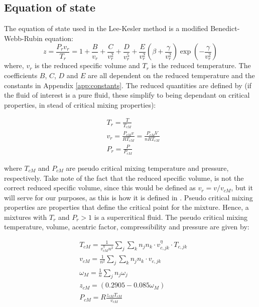 \documentclass[english]{../thermomemo/thermomemo}
\numberwithin{equation}{section}
\begin{document}
\subsection{Equation of state}
The equation of state used in the Lee-Kesler method is a modified Benedict-Webb-Rubin equation:
\begin{equation}
\label{def:z_LK}
z = \frac{P_r v_r}{T_r} = 1 + \frac{B}{v_r} + \frac{C}{v_r^2} + \frac{D}{v_r^5} + \frac{E}{v_r^2} \left( \beta + \frac{\gamma}{v_r^2} \right) \exp{\left(-\frac{\gamma}{v_r^2}\right)}
\end{equation}
where, $v_r$ is the reduced specific volume and $T_r$ is the reduced temperature. The coefficients $B$, $C$, $D$ and $E$ are all dependent on the reduced temperature and the constants in Appendix \ref{app:constants}. The reduced quantities are defined by (if the fluid of interest is a pure fluid, these simplify to being dependant on critical properties, in stead of critical mixing properties):

\begin{align}
& T_r = \frac{T}{T_{cM}} \label{eq:T_r} \\
& v_r = \frac{P_{cM} v}{R T_{cM}} = \frac{P_{cM} V}{n R T_{cM}} \label{eq:v_r} \\
& P_r = \frac{P}{P_{cM}} \label{eq:P_r} 
\end{align}

where $T_{cM}$ and $P_{cM}$ are pseudo critical mixing temperature and pressure, respectively. Take note of the fact that the reduced specific volume, is not the correct reduced specific volume, since this would be defined as $v_r = v/v_{cM}$, but it will serve for our purposes, as this is how it is defined in \cite{LK}. Pseudo critical mixing properties are properties that define the critical point for the mixture. Hence, a mixtures with $T_r$ and $P_r > 1$ is a supercritical fluid. The pseudo critical mixing temperature, volume, acentric factor, compressibility and pressure are given by:

\begin{align}
\label{eq:TcM}
& T_{cM} = \frac{1}{v_{cM}^\eta n^2} \sum_j \sum_k n_j n_k \cdot v_{c,jk}^\eta \cdot T_{c,jk} \\ 
\label{eq:vcM}
& v_{cM} = \frac{1}{n^2} \sum_j \sum_k n_j n_k \cdot v_{c,jk} \\ 
\label{eq:wM}
& \omega_M = \frac{1}{n} \sum_j n_j \omega_j  \\ 
\label{eq:zcM}
& z_{cM} = (0.2905 - 0.085 \omega_M)  \\
\label{eq:PcM}
& P_{cM} = R\frac{z_{cM} T_{cM}}{v_{cM}} 
\end{align}
\end{document}
